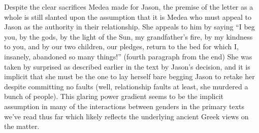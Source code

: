 \documentclass[letterpaper, reqno,11pt]{article}
\begin{document}
Despite the clear sacrifices Medea made for Jason, the premise of the letter as a whole is still slanted upon the assumption that it is Medea who must appeal to Jason as the authority in their relationship. She appeals to him by saying ``I beg you, by the gods, by the light of the Sun, my grandfather’s fire, by my kindness to you, and by our two children, our pledges, return to the bed for which I, insanely, abandoned so many things!'' (fourth paragraph from the end) She was taken by surprised as described earlier in the text by Jason's decision, and it is implicit that she must be the one to lay herself bare begging Jason to retake her despite committing no faults (well, relationship faults at least, she murdered a bunch of people). This glaring power gradient seems to be the implicit assumption in many of the interactions between genders in the primary texts we've read thus far which likely reflects the underlying ancient Greek views on the matter.
\end{document}
